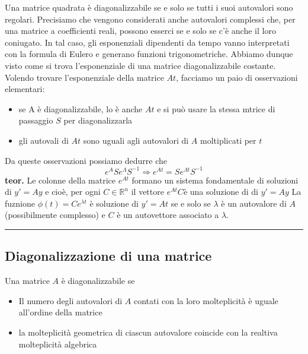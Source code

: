 \newline
Una matrice quadrata è diagonalizzabile se e solo se tutti i suoi autovalori sono regolari. \newline
\newline
Precisiamo che vengono considerati anche autovalori complessi che, per una matrice a coefficienti reali, possono esserci se e solo se c'è anche il loro coniugato. In tal caso, gli esponenziali dipendenti da tempo vanno interpretati con la formula di Eulero e generano funzioni trigonometriche.\newline
\newline
Abbiamo dunque visto come si trova l'esponenziale di una matrice diagonalizzabile costante. Volendo trovare l'esponenziale della matrice $At$, facciamo un paio di osservazioni elementari:
\begin{itemize}
    \item se A è diagonalizzabile, lo è anche $At$ e si può usare la stessa mtrice di passaggio $S$ per diagonalizzarla
    \item gli autovali di $At$ sono uguali agli autovalori di $A$ moltiplicati per $t$
\end{itemize}
Da queste osservazioni possiamo dedurre che
\[
    e^A  S e^{\Lambda}S^{-1} \Rightarrow  e^{At} = S e^{\Lambda t} S^{-1}
\]
\textbf{teor.} Le colonne della matrice $e^{At}$ formano un sistema fondamentale di soluzioni di $y' = Ay$ e cioè, per ogni $C \in \mathbb{R}^n$ il vettore $e^{At} C$è una soluzione di di $y'=Ay$\newline
\newline
La fuznione $\phi(t) = C e^{\lambda t} $ è soluzione di $y'=At$ se e solo se $\lambda$ è un autovalore di $A$ (possibilmente complesso) e $C$ è un autovettore associato a $\lambda$.\newline
\rule{\textwidth}{0,4pt}
\subsection{Diagonalizzazione di una matrice}
Una matrice $A$ è diagonalizzabile se
\begin{itemize}
    \item Il numero degli autovalori di $A$ contati con la loro molteplicità è uguale all'ordine della matrice
    \item la molteplicità geometrica di ciascun autovalore coincide  con la realtiva molteplicità algebrica
\end{itemize}

